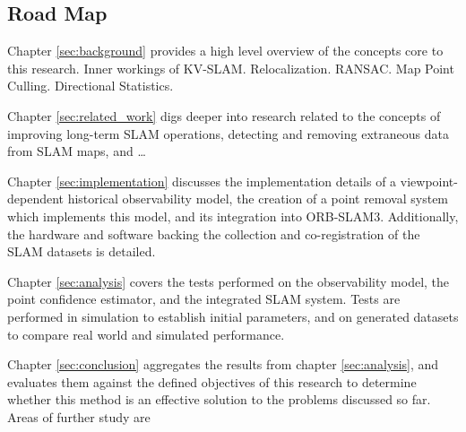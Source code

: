 \subsection{Road Map}

Chapter \ref{sec:background} provides a high level overview of the concepts core to this research. Inner workings of KV-SLAM. Relocalization. RANSAC. Map Point Culling. Directional Statistics.

Chapter \ref{sec:related_work} digs deeper into research related to the concepts of improving long-term SLAM operations, detecting and removing extraneous data from SLAM maps, and \dots

Chapter \ref{sec:implementation} discusses the implementation details of a viewpoint-dependent historical observability model, the creation of a point removal system which implements this model, and its integration into ORB-SLAM3. Additionally, the hardware and software backing the collection and co-registration of the SLAM datasets is detailed.

Chapter \ref{sec:analysis} covers the tests performed on the observability model, the point confidence estimator, and the integrated SLAM system. Tests are performed in simulation to establish initial parameters, and on generated datasets to compare real world and simulated performance.

Chapter \ref{sec:conclusion} aggregates the results from chapter \ref{sec:analysis}, and evaluates them against the defined objectives of this research to determine whether this method is an effective solution to the problems discussed so far. Areas of further study are 